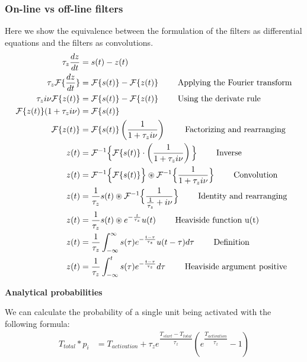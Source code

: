 \documentclass[10pt,a4paper]{article}
\begin{document}
\subsubsection{On-line vs off-line filters}
Here we show the equivalence between the formulation of the filters as differential equations and the filters as convolutions. 
\begin{align*}
\tau_z \dfrac{dz}{dt} &= s(t) - z(t) \\
\tau_z \mathcal{F}\{\dfrac{dz}{dt}\} &= \mathcal{F}\{s(t)\} -  \mathcal{F}\{ z(t) \}  \text{ \qquad Applying the Fourier transform} \\
\tau_z i \nu \mathcal{F}\{ z(t) \} &=  \mathcal{F}\{s(t)\} -  \mathcal{F}\{ z(t) \}  \text{ \qquad Using the derivate rule} \\
\mathcal{F}\{ z(t) \}(1 + \tau_z i \nu) &= \mathcal{F}\{s(t)\} \\ 
\mathcal{F}\{ z(t) \} &= \mathcal{F}\{s(t)\} \left(\frac{1}{1 +\tau_z i \nu } \right) \text{ \qquad Factorizing and rearranging} \\ 
z(t) &= \mathcal{F}^{-1} \Big\{ \mathcal{F}\{s(t)\} \cdot \left(\frac{1}{1 +\tau_z i \nu } \right) \Big\} \text{ \qquad Inverse}  \\ 
z(t) &= \mathcal{F}^{-1} \Big\{ \mathcal{F}\{s(t)\} \Big\} \circledast \mathcal{F}^{-1} \Big\{  \frac{1}{1 +\tau_z i \nu } \Big\} \text{ \qquad Convolution}  \\ 
z(t) &= \frac{1}{\tau_z } s(t) \circledast \mathcal{F}^{-1} \Big\{  \frac{1}{\frac{1}{\tau_z } + i \nu } \Big\} \text{ \qquad Identity and rearranging}  \\ 
z(t) &= \frac{1}{\tau_z } s(t) \circledast e^{-\frac{t}{\tau_z}}u(t)  \text{ \qquad Heaviside function u(t)}  \\ 
z(t) &= \frac{1}{\tau_z } \int_{-\infty}^{\infty} s(\tau) e^{-\frac{t - \tau}{\tau_z}}u(t - \tau) d\tau  \text{ \qquad Definition}  \\ 
z(t) &= \frac{1}{\tau_z } \int_{-\infty}^{t} s(\tau) e^{-\frac{t - \tau}{\tau_z}} d\tau  \text{ \qquad Heaviside argument positive}
\end{align*}

\textbf{Analytical probabilities}

We can calculate the probability of a single unit being activated with the following formula: 
\begin{align*}
T_{total} *  p_i &= T_{activation} + \tau_z e^{\dfrac{T_{start} - T_{total}}  {\tau_z}} \left( e^{\dfrac{T_{activation}}{\tau_z}} - 1  \right)
\end{align*}
\end{document}

